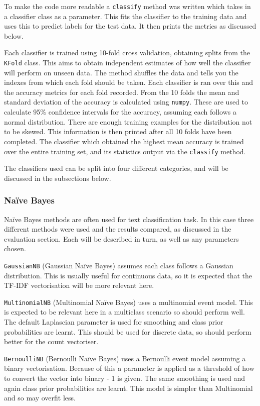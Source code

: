\documentclass{article}
\begin{document}
To make the code more readable a \verb|classify| method was written which takes in a classifier class as a parameter. This fits the classifier to the training data and uses this to predict labels for the test data. It then prints the metrics as discussed below.

Each classifier is trained using 10-fold cross validation, obtaining splits from the \verb|KFold| class. This aims to obtain independent estimates of how well the classifier will perform on unseen data. The method shuffles the data and tells you the indexes from which each fold should be taken. Each classifier is ran over this and the accuracy metrics for each fold recorded. From the 10 folds the mean and standard deviation of the accuracy is calculated using \verb|numpy|. These are used to calculate 95\% confidence intervals for the accuracy, assuming each follows a normal distribution. There are enough training examples for the distribution not to be skewed. This information is then printed after all 10 folds have been completed. The classifier which obtained the highest mean accuracy is trained over the entire training set, and its statistics output via the \verb|classify| method.

The classifiers used can be split into four different categories, and will be discussed in the subsections below.

\subsubsection{Na{\"i}ve Bayes}
Na{\"i}ve Bayes methods are often used for text classification task. In this case three different methods were used and the results compared, as discussed in the evaluation section. Each will be described in turn, as well as any parameters chosen.

\verb|GaussianNB| (Gaussian Na{\"i}ve Bayes) assumes each class follows a Gaussian distribution. This is usually useful for continuous data, so it is expected that the TF-IDF vectorisation will be more relevant here.

\verb|MultinomialNB| (Multinomial Na{\"i}ve Bayes) uses a multinomial event model. This is expected to be relevant here in a multiclass scenario so should perform well. The default Laplascian parameter is used for smoothing and class prior probabilities are learnt. This should be used for discrete data, so should perform better for the count vectoriser.

\verb|BernoulliNB| (Bernoulli Na{\"i}ve Bayes) uses a Bernoulli event model assuming a binary vectorisation. Because of this a parameter is applied as a threshold of how to convert the vector into binary - 1 is given. The same smoothing is used and again class prior probabilities are learnt. This model is simpler than Multinomial and so may overfit less.
\end{document}
